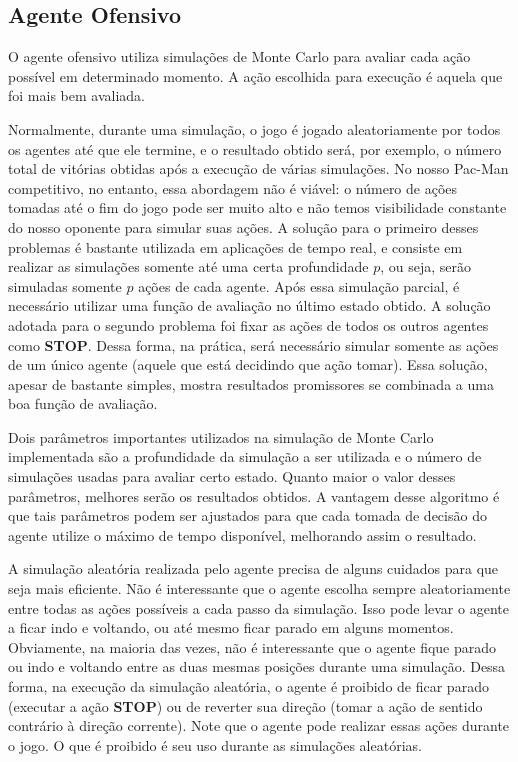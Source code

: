 \documentclass[a4paper,12pt]{article}
\begin{document}
\subsection{Agente Ofensivo}
O agente ofensivo utiliza simulações de Monte Carlo para avaliar cada ação possível em
determinado momento. A ação escolhida para execução é aquela que foi mais bem avaliada.

Normalmente, durante uma simulação, o jogo é jogado aleatoriamente por todos os agentes
até que ele termine, e o resultado obtido será, por exemplo, o número total de vitórias obtidas
após a execução de várias simulações. No nosso Pac-Man competitivo, no entanto, essa
abordagem não é viável: o número de ações tomadas até o fim do jogo pode ser muito alto e
não temos visibilidade constante do nosso oponente para simular suas ações. A solução para
o primeiro desses problemas é bastante utilizada em aplicações de tempo real, e consiste
em realizar as simulações somente até uma certa profundidade $p$, ou seja, serão simuladas
somente $p$ ações de cada agente. Após essa simulação parcial, é necessário utilizar uma
função de avaliação no último estado obtido. A solução adotada para o segundo problema
foi fixar as ações de todos os outros agentes como \textbf{STOP}. Dessa forma, na prática,
será necessário simular somente as ações de um único agente (aquele que está decidindo que ação tomar).
Essa solução, apesar de bastante simples, mostra resultados promissores se combinada a
uma boa função de avaliação.

Dois parâmetros importantes utilizados na simulação de Monte Carlo implementada são a profundidade
da simulação a ser utilizada e o número de simulações usadas para avaliar certo estado.
Quanto maior o valor desses parâmetros, melhores serão os resultados obtidos. A vantagem
desse algoritmo é que tais parâmetros podem ser ajustados para que cada tomada de decisão
do agente utilize o máximo de tempo disponível, melhorando assim o resultado.

A simulação aleatória realizada pelo agente precisa de alguns cuidados para que seja
mais eficiente. Não é interessante que o agente escolha sempre aleatoriamente entre todas
as ações possíveis a cada passo da simulação. Isso pode levar o agente a ficar indo e voltando,
ou até mesmo ficar parado em alguns momentos. Obviamente, na maioria das vezes, não é interessante
que o agente fique parado ou indo e voltando entre as duas mesmas posições durante uma simulação.
Dessa forma, na execução da simulação aleatória, o agente é proibido de ficar parado (executar
a ação \textbf{STOP}) ou de reverter sua direção (tomar a ação de sentido contrário à direção
corrente). Note que o agente pode realizar essas ações durante o jogo. O que é proibido é seu
uso durante as simulações aleatórias.
\end{document}
